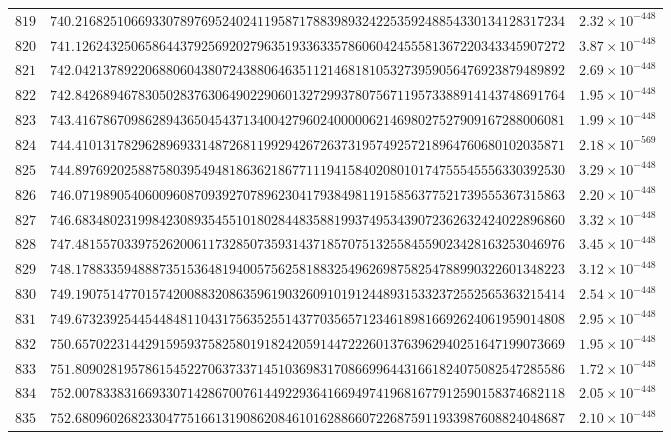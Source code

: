 \documentclass[12pt,reqno]{amsart}
\theoremstyle{remark}
\begin{document}
\begin{longtable}{clc}
$819$ & $740.2168251066933078976952402411958717883989324225359248854330134128317234$ & $2.32\times 10^{-448}$ \\
$820$ & $741.1262432506586443792569202796351933633578606042455581367220343345907272$ & $3.87\times 10^{-448}$ \\
$821$ & $742.0421378922068806043807243880646351121468181053273959056476923879489892$ & $2.69\times 10^{-448}$ \\
$822$ & $742.8426894678305028376306490229060132729937807567119573388914143748691764$ & $1.95\times 10^{-448}$ \\
$823$ & $743.4167867098628943650454371340042796024000006214698027527909167288006081$ & $1.99\times 10^{-448}$ \\
$824$ & $744.4101317829628969331487268119929426726373195749257218964760680102035871$ & $2.18\times 10^{-569}$ \\
$825$ & $744.8976920258875803954948186362186771119415840208010174755545556330392530$ & $3.29\times 10^{-448}$ \\
$826$ & $746.0719890540600960870939270789623041793849811915856377521739555367315863$ & $2.20\times 10^{-448}$ \\
$827$ & $746.6834802319984230893545510180284483588199374953439072362632424022896860$ & $3.32\times 10^{-448}$ \\
$828$ & $747.4815570339752620061173285073593143718570751325584559023428163253046976$ & $3.45\times 10^{-448}$ \\
$829$ & $748.1788335948887351536481940057562581883254962698758254788990322601348223$ & $3.12\times 10^{-448}$ \\
$830$ & $749.1907514770157420088320863596190326091019124489315332372552565363215414$ & $2.54\times 10^{-448}$ \\
$831$ & $749.6732392544544848110431756352551437703565712346189816692624061959014808$ & $2.95\times 10^{-448}$ \\
$832$ & $750.6570223144291595937582580191824205914472226013763962940251647199073669$ & $1.95\times 10^{-448}$ \\
$833$ & $751.8090281957861545227063733714510369831708669964431661824075082547285586$ & $1.72\times 10^{-448}$ \\
$834$ & $752.0078338316693307142867007614492293641669497419681677912590158374682118$ & $2.05\times 10^{-448}$ \\
$835$ & $752.6809602682330477516613190862084610162886607226875911933987608824048687$ & $2.10\times 10^{-448}$ \\

\end{longtable}
\end{document}
